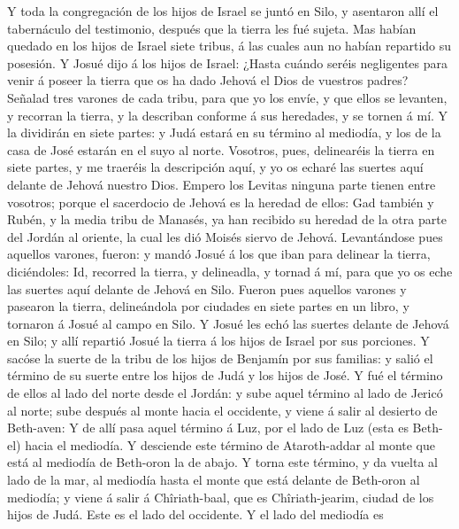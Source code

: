  Y toda la congregación de los hijos de Israel se juntó en
Silo, y asentaron allí el tabernáculo del testimonio, después que la
tierra les fué sujeta.  Mas habían quedado en los hijos de
Israel siete tribus, á las cuales aun no habían repartido su posesión.
 Y Josué dijo á los hijos de Israel: ¿Hasta cuándo seréis
negligentes para venir á poseer la tierra que os ha dado Jehová el Dios
de vuestros padres?  Señalad tres varones de cada tribu,
para que yo los envíe, y que ellos se levanten, y recorran la tierra, y
la describan conforme á sus heredades, y se tornen á mí. 
Y la dividirán en siete partes: y Judá estará en su término al mediodía,
y los de la casa de José estarán en el suyo al norte. 
Vosotros, pues, delinearéis la tierra en siete partes, y me traeréis la
descripción aquí, y yo os echaré las suertes aquí delante de Jehová
nuestro Dios.  Empero los Levitas ninguna parte tienen
entre vosotros; porque el sacerdocio de Jehová es la heredad de ellos:
Gad también y Rubén, y la media tribu de Manasés, ya han recibido su
heredad de la otra parte del Jordán al oriente, la cual les dió Moisés
siervo de Jehová.  Levantándose pues aquellos varones,
fueron: y mandó Josué á los que iban para delinear la tierra,
diciéndoles: Id, recorred la tierra, y delineadla, y tornad á mí, para
que yo os eche las suertes aquí delante de Jehová en Silo.
 Fueron pues aquellos varones y pasearon la tierra,
delineándola por ciudades en siete partes en un libro, y tornaron á
Josué al campo en Silo.  Y Josué les echó las suertes
delante de Jehová en Silo; y allí repartió Josué la tierra á los hijos
de Israel por sus porciones.  Y sacóse la suerte de la
tribu de los hijos de Benjamín por sus familias: y salió el término de
su suerte entre los hijos de Judá y los hijos de José.  Y
fué el término de ellos al lado del norte desde el Jordán: y sube aquel
término al lado de Jericó al norte; sube después al monte hacia el
occidente, y viene á salir al desierto de Beth-aven:  Y
de allí pasa aquel término á Luz, por el lado de Luz (esta es Beth-el)
hacia el mediodía. Y desciende este término de Ataroth-addar al monte
que está al mediodía de Beth-oron la de abajo.  Y torna
este término, y da vuelta al lado de la mar, al mediodía hasta el monte
que está delante de Beth-oron al mediodía; y viene á salir á
Chîriath-baal, que es Chîriath-jearim, ciudad de los hijos de Judá. Este
es el lado del occidente.  Y el lado del mediodía es
